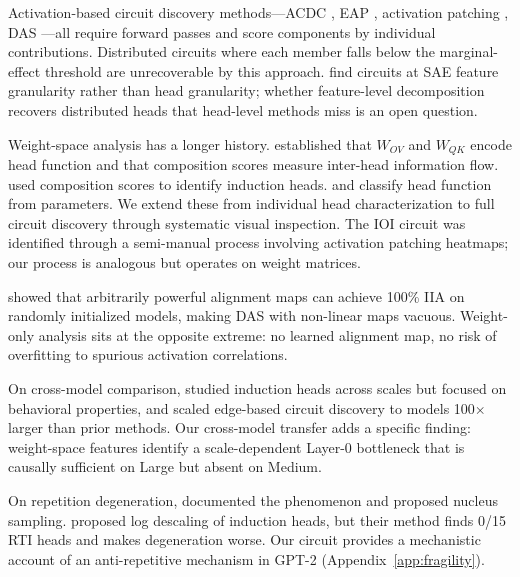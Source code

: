 \documentclass{article}
\begin{document}
Activation-based circuit discovery methods---ACDC
\citep{conmy2023acdc}, EAP \citep{syed2023eap}, activation
patching \citep{goldowsky-dill2023localizing}, DAS
\citep{geiger2024das}---all require forward passes and score components
by individual contributions. Distributed circuits where each member
falls below the marginal-effect threshold are unrecoverable by this
approach. \citet{marks2024sparse} find circuits at SAE feature
granularity rather than head granularity; whether feature-level
decomposition recovers distributed heads that head-level methods
miss is an open question.

Weight-space analysis has a longer history.
\citet{elhage2021mathematical} established that $W_{OV}$ and $W_{QK}$
encode head function and that composition scores measure inter-head
information flow. \citet{olsson2022icl} used composition scores to
identify induction heads. \citet{elhelo2025maps} and
\citet{golimblevskaia2025circuitlens} classify head function from
parameters. We extend these from individual head characterization to
full circuit discovery through systematic visual inspection. The IOI
circuit \citep{wang2023ioi} was identified through a semi-manual
process involving activation patching heatmaps; our process is
analogous but operates on weight matrices.

\citet{sutter2025alignment} showed that arbitrarily powerful alignment
maps can achieve 100\% IIA on randomly initialized models, making
DAS with non-linear maps vacuous. Weight-only analysis sits at the
opposite extreme: no learned alignment map, no risk of overfitting
to spurious activation correlations.

On cross-model comparison, \citet{olsson2022icl} studied induction
heads across scales but focused on behavioral properties, and
\citet{bhaskar2024consistent} scaled edge-based circuit discovery
to models 100$\times$ larger than prior methods. Our cross-model transfer adds
a specific finding: weight-space features identify a scale-dependent
Layer-0 bottleneck that is causally sufficient on Large but absent on
Medium.

On repetition degeneration, \citet{holtzman2020curious} documented the
phenomenon and proposed nucleus sampling. \citet{wang2025induction}
proposed log descaling of induction heads, but their method finds 0/15
RTI heads and makes degeneration worse. Our circuit provides a
mechanistic account of an anti-repetitive mechanism in GPT-2
(Appendix~\ref{app:fragility}).


\end{document}
